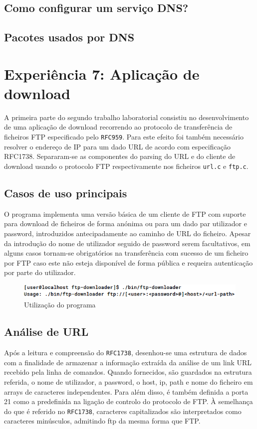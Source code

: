 \documentclass[a4paper,11pt,titlepage]{article}
\begin{document}
\subsection{Como configurar um serviço DNS?}

\subsection{Pacotes usados por DNS}

\section{Experiência 7: Aplicação de download}
A primeira parte do segundo trabalho laboratorial consistiu no desenvolvimento
de uma aplicação de download recorrendo ao protocolo de transferência de
ficheiros FTP especificado pelo \texttt{RFC959}. Para este efeito foi também
necessário resolver o endereço de IP para um dado URL de acordo com
especificação RFC1738. Separaram-se as componentes do parsing do URL e do
cliente de download usando o protocolo FTP respectivamente nos ficheiros
\texttt{url.c} e \texttt{ftp.c}.

\subsection*{Casos de uso principais}

O programa implementa uma versão básica de um cliente de FTP com suporte para
download de ficheiros de forma anónima ou para um dado par utilizador e
password, introduzidos antecipadamente ao caminho de URL do ficheiro.  Apesar
da introdução do nome de utilizador seguido de password serem facultativos, em
alguns casos tornam-se obrigatórios na transferência com sucesso de um ficheiro
por FTP caso este não esteja disponível de forma pública e requeira
autenticação por parte do utilizador.

\begin{figure}[H]
    \center
    \includegraphics[scale=0.6]{res/usage.png}
    \caption{Utilização do programa}
    \label{fig:usage.png}
\end{figure}

\subsection*{Análise de URL}
Após a leitura e compreensão do \texttt{RFC1738}, desenhou-se uma estrutura de
dados com a finalidade de armazenar a informação extraída da análise de um link
URL recebido pela linha de comandos. Quando fornecidos, são guardados na
estrutura referida, o nome de utilizador, a password, o host, ip, path e nome
do ficheiro em arrays de caracteres independentes. Para além disso, é também
definida a porta 21 como a predefinida na ligação de controlo do protocolo de
FTP. À semelhança do que é referido no \texttt{RFC1738}, caracteres
capitalizados são interpretados como caracteres minúsculos, admitindo ftp da
mesma forma que FTP.
\end{document}
